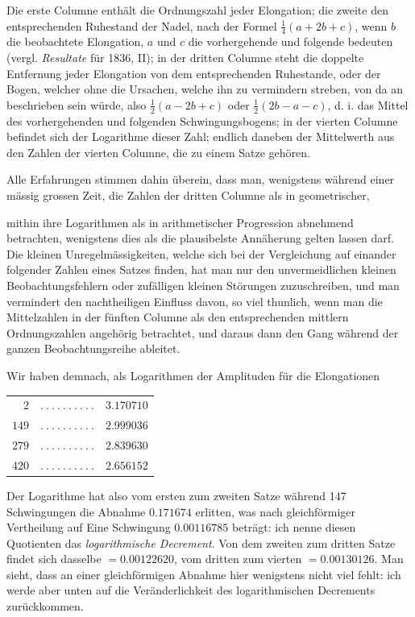 Die erste Columne enthält die Ordnungszahl jeder Elongation; die zweite den entsprechenden Ruhestand der Nadel, nach der Formel $\tfrac14(a+2b+c)$, wenn $b$ die beobachtete Elongation, $a$ und $c$ die vorhergehende und folgende bedeuten (vergl. \textit{Resultate} für 1836, II); in der dritten Columne steht die doppelte Entfernung jeder Elongation von dem entsprechenden Ruhestande, oder der Bogen, welcher ohne die Ursachen, welche ihn zu vermindern streben, von da an beschrieben sein würde, also $\tfrac12(a-2b+c)$ oder $\tfrac12(2b-a-c)$, d. i. das Mittel des vorhergehenden und folgenden Schwingungsbogens; in der vierten Columne befindet sich der Logarithme dieser Zahl; endlich daneben der Mittelwerth aus den Zahlen der vierten Columne, die zu einem Satze gehören.

Alle Erfahrungen stimmen dahin überein, dass man, wenigstens während einer mässig grossen Zeit, die Zahlen der dritten Columne als in geometrischer,
\par\clearpage
{}
\noindent mithin ihre Logarithmen als in arithmetischer Progression abnehmend betrachten, wenigstens dies als die plausibelste Annäherung gelten lassen darf. Die kleinen Unregelmässigkeiten, welche sich bei der Vergleichung auf einander folgender Zahlen eines Satzes finden, hat man nur den unvermeidlichen kleinen Beobachtungsfehlern oder zufälligen kleinen Störungen zuzuschreiben, und man vermindert den nachtheiligen Einfluss davon, so viel thunlich, wenn man die Mittelzahlen in der fünften Columne als den entsprechenden mittlern Ordnungszahlen angehörig betrachtet, und daraus dann den Gang während der ganzen Beobachtungsreihe ableitet.

Wir haben demnach, als Logarithmen der Amplituden für die Elongationen
\begin{center}
\begin{tabular}{rcl}
$2$ & $.\ .\ .\ .\ .\ .\ .\ .\ .\ .$ & $3.170710$\\
$149$ & $.\ .\ .\ .\ .\ .\ .\ .\ .\ .$ & $2.999036$\\
$279$ & $.\ .\ .\ .\ .\ .\ .\ .\ .\ .$ & $2.839630$\\
$420$ & $.\ .\ .\ .\ .\ .\ .\ .\ .\ .$ & $2.656152$
\end{tabular}
\end{center}

Der Logarithme hat also vom ersten zum zweiten Satze während 147 Schwingungen die Abnahme $0.171674$ erlitten, was nach gleichförmiger Vertheilung auf Eine Schwingung $0.00116785$ beträgt: ich nenne diesen Quotienten das \textit{logarithmische Decrement}. Von dem zweiten zum dritten Satze findet sich dasselbe $=0.00122620$, vom dritten zum vierten $=0.00130126$. Man sieht, dass an einer gleichförmigen Abnahme hier wenigstens nicht viel fehlt: ich werde aber unten auf die Veränderlichkeit des logarithmischen Decrements zurückkommen.

